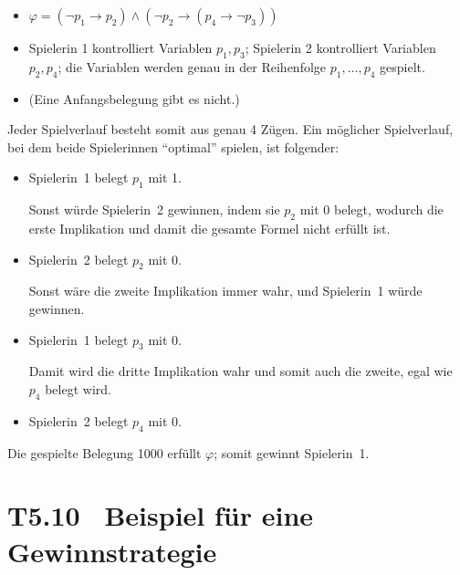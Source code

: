 \documentclass[fontsize=11pt, twoside=false, numbers=autoenddot]{scrbook}
\begin{document}
\begin{itemize}
  \item
    $\varphi = (\lnot p_1 \to p_2) \land (\lnot p_2 \to (p_4 \to \lnot p_3))$
  \item
    Spielerin 1 kontrolliert Variablen $p_1,p_3$;
    Spielerin 2 kontrolliert Variablen $p_2,p_4$;
    die Variablen werden genau in der Reihenfolge $p_1,\dots,p_4$ gespielt.
  \item
    (Eine Anfangsbelegung gibt es nicht.)
\end{itemize}
%
Jeder Spielverlauf besteht somit aus genau 4 Zügen.
Ein möglicher Spielverlauf, bei dem beide Spielerinnen "`optimal"' spielen,
ist folgender:
%
\begin{itemize}
  \item
    Spielerin~1 belegt $p_1$ mit 1.
    \par
    Sonst würde Spielerin~2 gewinnen, indem sie $p_2$ mit 0 belegt,
    wodurch die erste Implikation und damit die gesamte Formel nicht erfüllt ist.
  \item
    Spielerin~2 belegt $p_2$ mit 0.
    \par
    Sonst wäre die zweite Implikation immer wahr, und Spielerin~1 würde gewinnen.
  \item
    Spielerin~1 belegt $p_3$ mit 0.
    \par
    Damit wird die dritte Implikation wahr und somit auch die zweite, egal wie $p_4$ belegt wird.
  \item
    Spielerin~2 belegt $p_4$ mit 0.
\end{itemize}
%
Die gespielte Belegung 1000 erfüllt $\varphi$; somit gewinnt Spielerin~1.

\section*{T5.10~ Beispiel für eine Gewinnstrategie}
\end{document}
